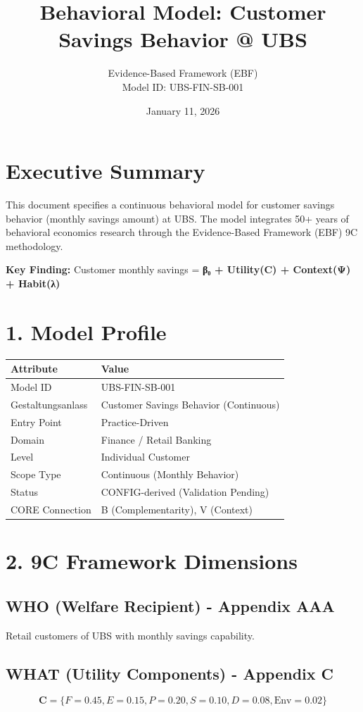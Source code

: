 \documentclass[11pt,a4paper]{article}
\title{\Large \textbf{Behavioral Model: Customer Savings Behavior @ UBS}}
\author{Evidence-Based Framework (EBF) \\Model ID: UBS-FIN-SB-001}
\date{January 11, 2026}
\begin{document}
\maketitle

\section{Executive Summary}

This document specifies a continuous behavioral model for customer savings behavior (monthly savings amount) at UBS. The model integrates 50+ years of behavioral economics research through the Evidence-Based Framework (EBF) 9C methodology.

\textbf{Key Finding:} Customer monthly savings = \textbf{β₀ + Utility(C) + Context(Ψ) + Habit(λ)}

\section{1. Model Profile}

\begin{tabular}{lp{8cm}}
\toprule
\textbf{Attribute} & \textbf{Value} \\
\midrule
Model ID & UBS-FIN-SB-001 \\
Gestaltungsanlass & Customer Savings Behavior (Continuous) \\
Entry Point & Practice-Driven \\
Domain & Finance / Retail Banking \\
Level & Individual Customer \\
Scope Type & Continuous (Monthly Behavior) \\
Status & CONFIG-derived (Validation Pending) \\
CORE Connection & B (Complementarity), V (Context) \\
\bottomrule
\end{tabular}

\section{2. 9C Framework Dimensions}

\subsection{WHO (Welfare Recipient) - Appendix AAA}
Retail customers of UBS with monthly savings capability.

\subsection{WHAT (Utility Components) - Appendix C}
\[
\mathbf{C} = \{F=0.45, E=0.15, P=0.20, S=0.10, D=0.08, \text{Env}=0.02\}
\]
\end{document}
